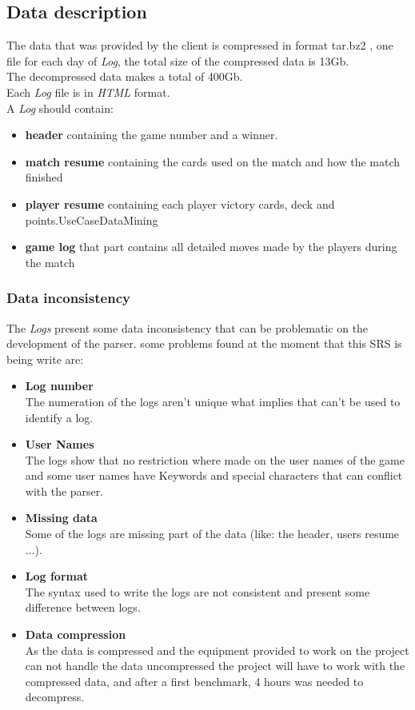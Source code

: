 \documentclass{scrreprt}
\begin{document}
\subsection{Data description}
The data that was provided by the client is compressed in format tar.bz2 , one file for each day of \textit{Log}, the total size of the compressed data is
13Gb.\\
The decompressed data makes a total of 400Gb.\\
Each \textit{Log} file is in \textit{HTML} format.\\
A \textit{Log} should contain:
\begin{itemize}
  \item{\textbf{header}} containing the game number and a winner.
  \item{\textbf{match resume}} containing the cards used on the match and how the match
    finished
  \item{\textbf{player resume}} containing each player victory cards, deck and points.UseCaseDataMining
  \item{\textbf{game log}} that part contains all detailed moves made by the players
    during the match
\end{itemize}

\subsubsection{Data inconsistency}
The \textit{Logs} present some data inconsistency that can be problematic on the
development of the parser.
some problems found at the moment that this SRS is being write are:
\begin{itemize}
  \item \textbf{Log number}\\
    The numeration of the logs aren't unique what implies that can't be used to
    identify a log.
  \item \textbf{User Names}\\
    The logs show that no restriction where made on the user names of the game
    and some user names have Keywords and special characters that can conflict
    with the parser.
   \item \textbf{Missing data}\\
     Some of the logs are missing part of the data (like: the header, users
     resume $\ldots$).
   \item \textbf{Log format}\\
     The syntax used to write the logs are not consistent and present some
     difference between logs.
    \item \textbf{Data compression}\\
      As the data is compressed and the equipment provided to work on the
      project can not handle the data uncompressed the project will have to work
      with the compressed data, and after a first benchmark, 4 hours was needed
      to decompress.
\end{itemize}
\end{document}
